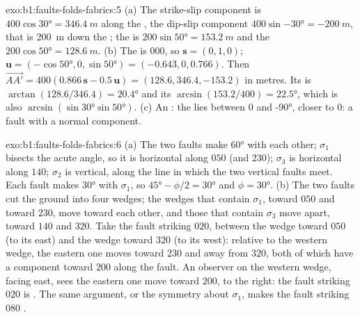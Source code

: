 \begin{solution}{exo:b1:faults-folds-fabrics:5}
(a) The strike-slip component is $400\cos\ang{30} = \qty{346.4}{m}$ along the
, the dip-slip component $400\sin\ang{-30} = \qty{-200}{m}$, that is
\qty{200}{m} down the ; the  is $200\sin\ang{50} = \qty{153.2}{m}$ and
the  $200\cos\ang{50} = \qty{128.6}{m}$. (b) The  is $000$, so
$\mathbf s = (0, 1, 0)$; $\mathbf u = (-\cos\ang{50}, 0, \sin\ang{50}) =
(-0.643, 0, 0.766)$. Then
$\overrightarrow{AA'} = 400(0.866\,\mathbf s - 0.5\,\mathbf u) =
(128.6, 346.4, -153.2)$ in metres. Its  is $\arctan(128.6/346.4) =
\ang{20.4}$ and its  $\arcsin(153.2/400) = \ang{22.5}$, which is also
$\arcsin(\sin\ang{30}\sin\ang{50})$. (c) An : the  lies
between $0$ and \ang{-90}, closer to $0$: a  fault with a normal
component.
\end{solution}

\begin{solution}{exo:b1:faults-folds-fabrics:6}
(a) The two faults make \ang{60} with each other; $\sigma_1$ bisects the acute
angle, so it is horizontal along $050$ (and $230$); $\sigma_3$ is horizontal
along $140$; $\sigma_2$ is vertical, along the line in which the two vertical
faults meet. Each fault makes \ang{30} with $\sigma_1$, so $\ang{45} - \phi/2 =
\ang{30}$ and $\phi = \ang{30}$. (b) The two faults cut the ground into four
wedges; the wedges that contain $\sigma_1$, toward $050$ and toward $230$, move
toward each other, and those that contain $\sigma_3$ move apart, toward $140$
and $320$. Take the fault striking $020$, between the wedge toward $050$ (to its
east) and the wedge toward $320$ (to its west): relative to the western wedge,
the eastern one moves toward $230$ and away from $320$, both of which have a
component toward $200$ along the fault. An observer on the western wedge,
facing east, sees the eastern one move toward $200$, to the right: the fault
striking $020$ is . The same argument, or the symmetry about
$\sigma_1$, makes the fault striking $080$ .
\end{solution}

